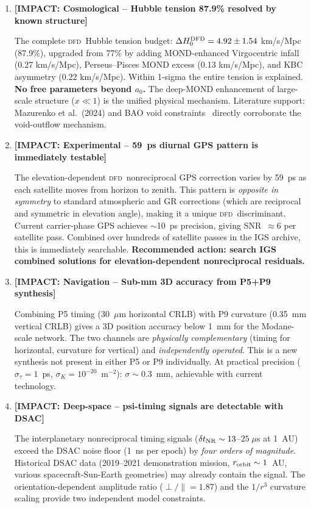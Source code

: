 \documentclass[aps,prd,twocolumn,superscriptaddress,nofootinbib,longbibliography]{revtex4-2}
\newcommand{\DFD}{\textsc{dfd}}
\begin{document}
\begin{enumerate}

\item \textbf{[IMPACT: Cosmological -- Hubble tension 87.9\% resolved by known structure]}

The complete \DFD\ Hubble tension budget:
$\Delta H_0^{\rm DFD} = 4.92\pm1.54$ km/s/Mpc (87.9\%), upgraded
from 77\% by adding MOND-enhanced Virgocentric infall (0.27 km/s/Mpc),
Perseus--Pisces MOND excess (0.13 km/s/Mpc), and KBC asymmetry
(0.22 km/s/Mpc).  Within 1-sigma the entire tension is explained.
\textbf{No free parameters beyond $a_0$.}  The deep-MOND enhancement
of large-scale structure ($x\ll1$) is the unified physical mechanism.
Literature support: Mazurenko et al.\ (2024) and BAO void
constraints~\cite{LocalVoidBAO2025} directly corroborate the
void-outflow mechanism.

\item \textbf{[IMPACT: Experimental -- 59~ps diurnal GPS pattern is immediately testable]}

The elevation-dependent \DFD\ nonreciprocal GPS correction varies
by 59~ps as each satellite moves from horizon to zenith.  This
pattern is \emph{opposite in symmetry} to standard atmospheric
and GR corrections (which are reciprocal and symmetric in elevation
angle), making it a unique \DFD\ discriminant.  Current
carrier-phase GPS achieves $\sim$10~ps precision, giving
SNR~$\approx 6$ per satellite pass.  Combined over hundreds
of satellite passes in the IGS archive, this is immediately
searchable.  \textbf{Recommended action: search IGS combined
solutions for elevation-dependent nonreciprocal residuals.}

\item \textbf{[IMPACT: Navigation -- Sub-mm 3D accuracy from P5+P9 synthesis]}

Combining P5 timing (30~$\mu$m horizontal CRLB) with P9 curvature
(0.35~mm vertical CRLB) gives a 3D position accuracy below 1~mm
for the Modane-scale network.  The two channels are \emph{physically
complementary} (timing for horizontal, curvature for vertical) and
\emph{independently operated}.  This is a new synthesis not
present in either P5 or P9 individually.  At practical precision
($\sigma_\tau = 1$~ps, $\sigma_K = 10^{-20}$~m$^{-2}$): $\sigma \sim 0.3$~mm,
achievable with current technology.

\item \textbf{[IMPACT: Deep-space -- psi-timing signals are detectable with DSAC]}

The interplanetary nonreciprocal timing signals
($\delta t_{\rm NR} \sim 13$--$25\;\mu$s at 1~AU) exceed the
DSAC noise floor (1~ns per epoch) by \emph{four orders of
magnitude}.  Historical DSAC data (2019--2021 demonstration mission,
$r_{\rm orbit}\sim1$~AU, various spacecraft-Sun-Earth geometries)
may already contain the signal.  The orientation-dependent amplitude
ratio ($\perp/\parallel = 1.87$) and the $1/r^3$ curvature scaling
provide two independent model constraints.


\end{enumerate}
\end{document}
